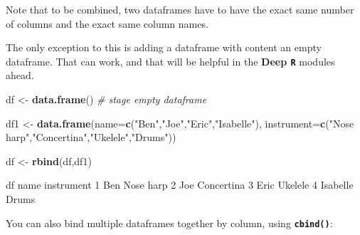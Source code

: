 \documentclass[]{book}
\newenvironment{Shaded}{\begin{snugshade}}{\end{snugshade}}
\newcommand{\CommentTok}[1]{\textcolor[rgb]{0.56,0.35,0.01}{\textit{#1}}}
\newcommand{\DataTypeTok}[1]{\textcolor[rgb]{0.13,0.29,0.53}{#1}}
\newcommand{\DecValTok}[1]{\textcolor[rgb]{0.00,0.00,0.81}{#1}}
\newcommand{\KeywordTok}[1]{\textcolor[rgb]{0.13,0.29,0.53}{\textbf{#1}}}
\newcommand{\NormalTok}[1]{#1}
\newcommand{\StringTok}[1]{\textcolor[rgb]{0.31,0.60,0.02}{#1}}
\begin{document}
Note that to be combined, two dataframes have to have the exact same number of columns and the exact same column names.

The only exception to this is adding a dataframe with content an empty dataframe. That can work, and that will be helpful in the \textbf{Deep \texttt{R}} modules ahead.

\begin{Shaded}
\begin{Highlighting}[]
\NormalTok{df <-}\StringTok{ }\KeywordTok{data.frame}\NormalTok{() }\CommentTok{# stage empty dataframe}

\NormalTok{df1 <-}\StringTok{ }\KeywordTok{data.frame}\NormalTok{(}\DataTypeTok{name=}\KeywordTok{c}\NormalTok{(}\StringTok{"Ben"}\NormalTok{,}\StringTok{"Joe"}\NormalTok{,}\StringTok{"Eric"}\NormalTok{,}\StringTok{"Isabelle"}\NormalTok{),}
                  \DataTypeTok{instrument=}\KeywordTok{c}\NormalTok{(}\StringTok{"Nose harp"}\NormalTok{,}\StringTok{"Concertina"}\NormalTok{,}\StringTok{"Ukelele"}\NormalTok{,}\StringTok{"Drums"}\NormalTok{))}

\NormalTok{df <-}\StringTok{ }\KeywordTok{rbind}\NormalTok{(df,df1)}

\NormalTok{df}
\NormalTok{      name instrument}
\DecValTok{1}\NormalTok{      Ben  Nose harp}
\DecValTok{2}\NormalTok{      Joe Concertina}
\DecValTok{3}\NormalTok{     Eric    Ukelele}
\DecValTok{4}\NormalTok{ Isabelle      Drums}
\end{Highlighting}
\end{Shaded}

You can also bind multiple dataframes together by column, using \textbf{\texttt{cbind()}}:
\end{document}
